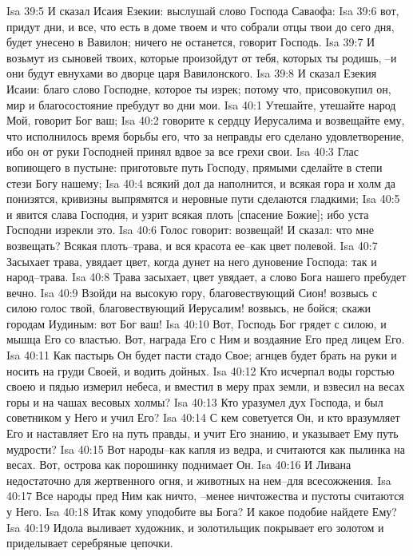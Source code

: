 Isa 39:5  И сказал Исаия Езекии: выслушай слово Господа Саваофа:
Isa 39:6  вот, придут дни, и все, что есть в доме твоем и что собрали отцы твои до сего дня, будет унесено в Вавилон; ничего не останется, говорит Господь.
Isa 39:7  И возьмут из сыновей твоих, которые произойдут от тебя, которых ты родишь, --и они будут евнухами во дворце царя Вавилонского.
Isa 39:8  И сказал Езекия Исаии: благо слово Господне, которое ты изрек; потому что, присовокупил он, мир и благосостояние пребудут во дни мои.
Isa 40:1  Утешайте, утешайте народ Мой, говорит Бог ваш;
Isa 40:2  говорите к сердцу Иерусалима и возвещайте ему, что исполнилось время борьбы его, что за неправды его сделано удовлетворение, ибо он от руки Господней принял вдвое за все грехи свои.
Isa 40:3  Глас вопиющего в пустыне: приготовьте путь Господу, прямыми сделайте в степи стези Богу нашему;
Isa 40:4  всякий дол да наполнится, и всякая гора и холм да понизятся, кривизны выпрямятся и неровные пути сделаются гладкими;
Isa 40:5  и явится слава Господня, и узрит всякая плоть [спасение Божие]; ибо уста Господни изрекли это.
Isa 40:6  Голос говорит: возвещай! И сказал: что мне возвещать? Всякая плоть--трава, и вся красота ее--как цвет полевой.
Isa 40:7  Засыхает трава, увядает цвет, когда дунет на него дуновение Господа: так и народ--трава.
Isa 40:8  Трава засыхает, цвет увядает, а слово Бога нашего пребудет вечно.
Isa 40:9  Взойди на высокую гору, благовествующий Сион! возвысь с силою голос твой, благовествующий Иерусалим! возвысь, не бойся; скажи городам Иудиным: вот Бог ваш!
Isa 40:10  Вот, Господь Бог грядет с силою, и мышца Его со властью. Вот, награда Его с Ним и воздаяние Его пред лицем Его.
Isa 40:11  Как пастырь Он будет пасти стадо Свое; агнцев будет брать на руки и носить на груди Своей, и водить дойных.
Isa 40:12  Кто исчерпал воды горстью своею и пядью измерил небеса, и вместил в меру прах земли, и взвесил на весах горы и на чашах весовых холмы?
Isa 40:13  Кто уразумел дух Господа, и был советником у Него и учил Его?
Isa 40:14  С кем советуется Он, и кто вразумляет Его и наставляет Его на путь правды, и учит Его знанию, и указывает Ему путь мудрости?
Isa 40:15  Вот народы--как капля из ведра, и считаются как пылинка на весах. Вот, острова как порошинку поднимает Он.
Isa 40:16  И Ливана недостаточно для жертвенного огня, и животных на нем--для всесожжения.
Isa 40:17  Все народы пред Ним как ничто, --менее ничтожества и пустоты считаются у Него.
Isa 40:18  Итак кому уподобите вы Бога? И какое подобие найдете Ему?
Isa 40:19  Идола выливает художник, и золотильщик покрывает его золотом и приделывает серебряные цепочки.
